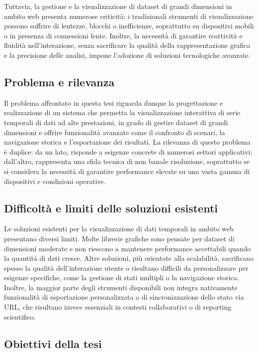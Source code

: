 Tuttavia, la gestione e la visualizzazione di dataset di grandi dimensioni in ambito web presenta numerose criticità: i tradizionali strumenti di visualizzazione possono soffrire di lentezze, blocchi o inefficienze, soprattutto su dispositivi mobili o in presenza di connessioni lente. Inoltre, la necessità di garantire reattività e fluidità nell’interazione, senza sacrificare la qualità della rappresentazione grafica e la precisione delle analisi, impone l’adozione di soluzioni tecnologiche avanzate.

\subsection{Problema e rilevanza}

Il problema affrontato in questa tesi riguarda dunque la progettazione e realizzazione di un sistema che permetta la visualizzazione interattiva di serie temporali di dati ad alte prestazioni, in grado di gestire dataset di grandi dimensioni e offrire funzionalità avanzate come il confronto di scenari, la navigazione storica e l’esportazione dei risultati. La rilevanza di questo problema è duplice: da un lato, risponde a esigenze concrete di numerosi settori applicativi; dall’altro, rappresenta una sfida tecnica di non banale risoluzione, soprattutto se si considera la necessità di garantire performance elevate su una vasta gamma di dispositivi e condizioni operative.

\subsection{Difficoltà e limiti delle soluzioni esistenti}

Le soluzioni esistenti per la visualizzazione di dati temporali in ambito web presentano diversi limiti. Molte librerie grafiche sono pensate per dataset di dimensioni moderate e non riescono a mantenere performance accettabili quando la quantità di dati cresce. Altre soluzioni, più orientate alla scalabilità, sacrificano spesso la qualità dell’interazione utente o risultano difficili da personalizzare per esigenze specifiche, come la gestione di stati multipli o la navigazione storica. Inoltre, la maggior parte degli strumenti disponibili non integra nativamente funzionalità di esportazione personalizzata o di sincronizzazione dello stato via URL, che risultano invece essenziali in contesti collaborativi o di reporting scientifico.

\subsection{Obiettivi della tesi}

